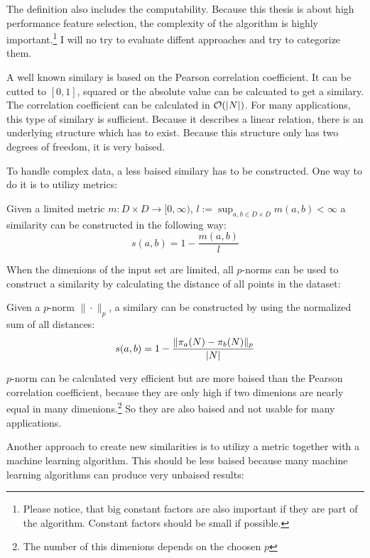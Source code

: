 The definition also includes the computability. Because this thesis is about high performance feature selection, the complexity of the algorithm is highly important.\footnote{Please notice, that big constant factors are also important if they are part of the algorithm. Constant factors should be small if possible.} I will no try to evaluate diffent approaches and try to categorize them.

A well known similary is based on the Pearson correlation coefficient. It can be cutted to $[0,1]$, squared or the absolute value can be calcuated to get a similary. The correlation coefficient can be calculated in $\mathcal{O}(\left|N\right|)$. For many applications, this type of similary is sufficient. Because it describes a linear relation, there is an underlying structure which has to exist. Because this structure only has two degrees of freedom, it is very baised.

To handle complex data, a less baised similary has to be constructed. One way to do it is to utilizy metrics:

\begin{envtheo}
	Given a limited metric $m : D \times D \rightarrow [0,\infty)$, $l := \sup_{a,b \in D \times D} m(a,b) < \infty$ a similarity can be constructed in the following way:
	\begin{equation}
		s(a,b) = 1 - \frac{m(a,b)}{l}
	\end{equation}
\end{envtheo}

When the dimenions of the input set are limited, all $p$-norms can be used to construct a similarity by calculating the distance of all points in the dataset:

\begin{envtheo}
	Given a $p$-norm $\|\cdot\|_p$, a similary can be constructed by using the normalized sum of all distances:
	\begin{equation}
		s(a,b) = 1 - \frac{\|\pi_a(N) - \pi_b(N)\|_p}{\left|N\right|}
	\end{equation}
\end{envtheo}

$p$-norm can be calculated very efficient but are more baised than the Pearson correlation coefficient, because they are only high if two dimenions are nearly equal in many dimenions.\footnote{The number of this dimenions depends on the choosen $p$} So they are also baised and not usable for many applications.

Another approach to create new similarities is to utilizy a metric together with a machine learning algorithm. This should be less baised because many machine learning algorithms can produce very unbaised results:

